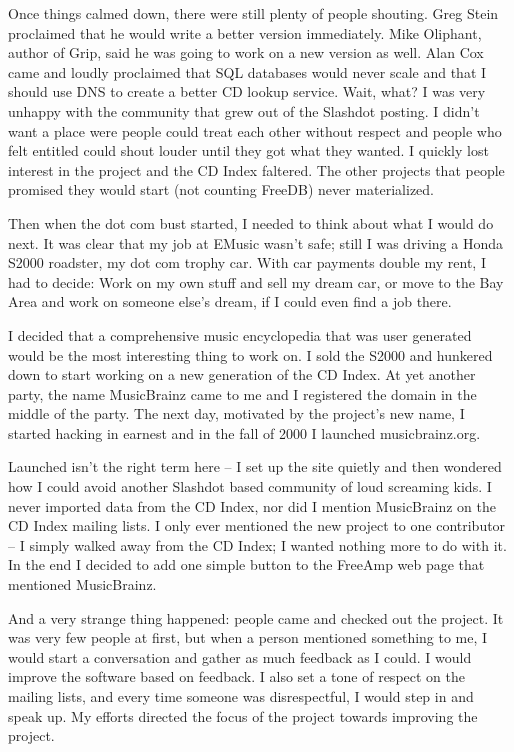 Once things calmed down, there were still plenty of people shouting. Greg Stein proclaimed that he would write a better version immediately. Mike Oliphant, author of Grip, said he was going to work on a new version as well. Alan Cox came and loudly proclaimed that SQL databases would never scale and that I should use DNS to create a better CD lookup service. Wait, what?
I was very unhappy with the community that grew out of the Slashdot posting. I didn’t want a place were people could treat each other without respect and people who felt entitled could shout louder until they got what they wanted. I quickly lost interest in the project and the CD Index faltered. The other projects that people promised they would start (not counting FreeDB) never materialized.

Then when the dot com bust started, I needed to think about what I would do next. It was clear that my job at EMusic wasn’t safe; still I was driving a Honda S2000 roadster, my dot com trophy car. With car payments double my rent, I had to decide: Work on my own stuff and sell my dream car, or move to the Bay Area and work on someone else’s dream, if I could even find a job there.

I decided that a comprehensive music encyclopedia that was user generated would be the most interesting thing to work on. I sold the S2000 and hunkered down to start working on a new generation of the CD Index. At yet another party, the name MusicBrainz came to me and I registered the domain in the middle of the party. The next day, motivated by the project’s new name, I started hacking in earnest and in the fall of 2000 I launched musicbrainz.org.

Launched isn’t the right term here -- I set up the site quietly and then wondered how I could avoid another Slashdot based community of loud screaming kids. I never imported data from the CD Index, nor did I mention MusicBrainz on the CD Index mailing lists. I only ever mentioned the new project to one contributor -- I simply walked away from the CD Index; I wanted nothing more to do with it. In the end I decided to add one simple button to the FreeAmp web page that mentioned MusicBrainz.

And a very strange thing happened: people came and checked out the project. It was very few people at first, but when a person mentioned something to me, I would start a conversation and gather as much feedback as I could. I would improve the software based on feedback. I also set a tone of respect on the mailing lists, and every time someone was disrespectful, I would step in and speak up. My efforts directed the focus of the project towards improving the project. 

